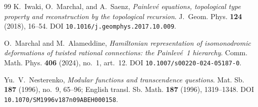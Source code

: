 \documentclass[11pt,reqno]{amsart}
\theoremstyle{plain}
\theoremstyle{definition}
\begin{document}
\begin{thebibliography}{99}
K.~Iwaki, O.~Marchal, and A.~Saenz,
\emph{Painlev\'e equations, topological type property and reconstruction by the topological
recursion}.
J.~Geom. Phys. \textbf{124} (2018), 16--54.
DOI \texttt{10.1016/j.geomphys.2017.10.009}.

O.~Marchal and M.~Alameddine,
\emph{Hamiltonian representation of isomonodromic deformations of twisted rational connections: the
Painlev\'e~1 hierarchy}.
Comm. Math. Phys. \textbf{406} (2024), no.~1, art.~12.
DOI \texttt{10.1007/s00220-024-05187-0}.

Yu.~V.~Nesterenko,
\emph{Modular functions and transcendence questions}.
Mat. Sb. \textbf{187} (1996), no.~9, 65--96; English transl. Sb. Math. \textbf{187} (1996),
1319--1348.
DOI \texttt{10.1070/SM1996v187n09ABEH000158}.

\end{thebibliography}
\end{document}
